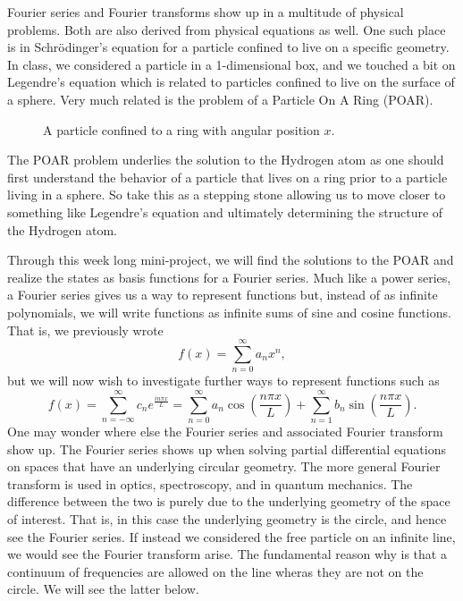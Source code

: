 \documentclass{article}
\begin{document}
Fourier series and Fourier transforms show up in a multitude of physical problems.  Both are also derived from physical equations as well.  One such place is in Schr\"odinger's equation for a particle confined to live on a specific geometry.  In class, we considered a particle in a 1-dimensional box, and we touched a bit on Legendre's equation which is related to particles confined to live on the surface of a sphere.  Very much related is the problem of a Particle On A Ring (POAR). 

\begin{figure}[H]
    \centering \qquad \qquad \qquad \qquad \qquad \qquad \qquad 
  	\resizebox{.75\textwidth}{!}{}
    \caption{A particle confined to a ring with angular position $x$.}
\end{figure}

The POAR problem underlies the solution to the Hydrogen atom as one should first understand the behavior of a particle that lives on a ring prior to a particle living in a sphere.  So take this as a stepping stone allowing us to move closer to something like Legendre's equation and ultimately determining the structure of the Hydrogen atom.

Through this week long mini-project, we will find the solutions to the POAR and realize the states as basis functions for a Fourier series.  Much like a power series, a Fourier series gives us a way to represent functions but, instead of as infinite polynomials, we will write functions as infinite sums of sine and cosine functions.  That is, we previously wrote
\[
f(x) = \sum_{n=0}^\infty a_nx^n,
\]
but we will now wish to investigate further ways to represent functions such as
\[
f(x) = \sum_{n=-\infty}^\infty c_n e^{\frac{in\pi x}{L}} = \sum_{n=0}^\infty a_n \cos\left(\frac{n\pi x}{L}\right) + \sum_{n=1}^\infty b_n \sin\left(\frac{n\pi x}{L}\right).
\]
One may wonder where else the Fourier series and associated Fourier transform show up.  The Fourier series shows up when solving partial differential equations on spaces that have an underlying circular geometry.  The more general Fourier transform is used in optics, spectroscopy, and in quantum mechanics.  The difference between the two is purely due to the underlying geometry of the space of interest.  That is, in this case the underlying geometry is the circle, and hence see the Fourier series. If instead we considered the free particle on an infinite line, we would see the Fourier transform arise. The fundamental reason why is that a continuum of frequencies are allowed on the line wheras they are not on the circle. We will see the latter below.
\end{document}
